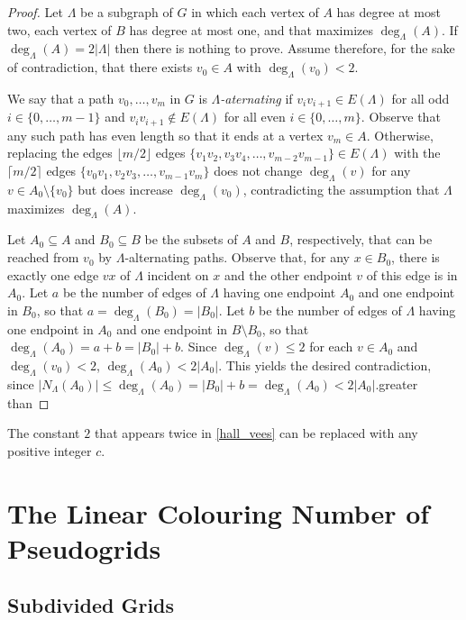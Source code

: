 \documentclass{patmorin}
\begin{document}
\begin{proof}
  Let $\Lambda$ be a subgraph of $G$ in which each vertex of $A$ has degree at most two, each vertex of $B$ has degree at most one, and that maximizes $\deg_\Lambda(A)$.  If $\deg_{\Lambda}(A) = 2|\Lambda|$ then there is nothing to prove. Assume therefore, for the sake of contradiction,  that there exists $v_0\in A$ with $\deg_\Lambda(v_0) < 2$.

  We say that a path $v_0,\ldots,v_m$ in $G$ is \emph{$\Lambda$-aternating} if $v_iv_{i+1}\in E(\Lambda)$ for all odd $i\in\{0,\ldots,m-1\}$ and $v_iv_{i+1}\not\in E(\Lambda)$ for all even $i\in\{0,\ldots,m\}$.  Observe that any such path has even length so that it ends at a vertex $v_m\in A$.  Otherwise, replacing the edges $\lfloor m/2\rfloor$ edges $\{v_1v_2,v_3v_4,\ldots,v_{m-2}v_{m-1}\}\in E(\Lambda)$ with the $\lceil m/2\rceil$ edges $\{v_0v_1,v_2v_3,\ldots,v_{m-1}v_m\}$ does not change $\deg_\Lambda(v)$ for any $v\in A_0\setminus\{v_0\}$ but does increase  $\deg_\Lambda(v_0)$, contradicting the assumption that $\Lambda$ maximizes $\deg_\Lambda(A)$.

  Let $A_0\subseteq A$ and $B_0\subseteq B$ be the subsets of $A$ and $B$, respectively, that can be reached from $v_0$ by $\Lambda$-alternating paths.
  Observe that, for any $x\in B_0$,  there is exactly one edge $vx$ of $\Lambda$ incident on $x$ and the other endpoint $v$ of this edge is in $A_0$.  Let $a$ be the number of edges of $\Lambda$ having one endpoint $A_0$ and one endpoint in $B_0$, so that $a=\deg_\Lambda(B_0)=|B_0|$.  Let $b$ be the number of edges of $\Lambda$ having one endpoint in $A_0$ and one endpoint in $B\setminus B_0$, so that $\deg_\Lambda(A_0)=a+b = |B_0|+b$.    Since $\deg_{\Lambda}(v) \le 2$ for each $v\in A_0$ and $\deg_\Lambda(v_0)<2$, $\deg_\Lambda(A_0)<2|A_0|$.  This yields the desired contradiction, since $|N_\Lambda(A_0)| \le \deg_\Lambda(A_0) = |B_0|+b = \deg_\Lambda(A_0)< 2|A_0|$.greater than
\end{proof}

\begin{rem}
  The constant $2$ that appears twice in \cref{hall_vees} can be replaced with any positive integer $c$.
\end{rem}


\section{The Linear Colouring Number of Pseudogrids}


\subsection{Subdivided Grids}
\end{document}
